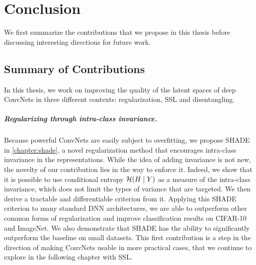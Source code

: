 \chapter{Conclusion}
\label{chapter:conclusion}

\acresetall
{}

We first summarize the contributions that we propose in this thesis before discussing interesting directions for future work.

\section{Summary of Contributions}

In this thesis, we work on improving the quality of the latent spaces of deep \acfp{ConvNet} in three different contexts: regularization, \acf{SSL} and disentangling.

\paragraph{Regularizing through intra-class invariance.} Because powerful \acp{ConvNet} are easily subject to overfitting, we propose \ac{SHADE} in \autoref{chapter:shade}, a novel regularization method that encourages intra-class invariance in the representations. While the idea of adding invariance is not new, the novelty of our contribution lies in the way to enforce it. Indeed, we show that it is possible to use conditional entropy $\mathcal{H}(H\mid Y)$ as a measure of the intra-class invariance, which does not limit the types of variance that are targeted. We then derive a tractable and differentiable criterion from it. Applying this \ac{SHADE} criterion to many standard \ac{DNN} architectures, we are able to outperform other common forms of regularization and improve classification results on CIFAR-10 and ImageNet. We also demonstrate that \ac{SHADE} has the ability to significantly outperform the baseline on small datasets. This first contribution is a step in the direction of making \acp{ConvNet} usable in more practical cases, that we continue to explore in the following chapter with \acs{SSL}.


